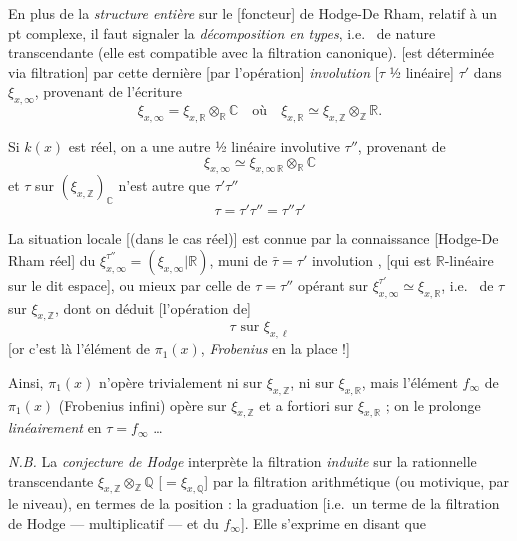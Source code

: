 \documentclass[11pt,a4paper]{article}
\begin{document}
En plus de la \emph{structure entière} sur le \struck{\ill{}} [foncteur] de
Hodge-De Rham, relatif à un pt complexe, il faut signaler la
\emph{décomposition en types}, i.e.\  de nature
transcendante (elle est compatible avec la filtration canonique).
 \ill{} [est déterminée via filtration] par cette
dernière \struck{\ill{}} [par l'opération] \emph{involution} [$\tau$
½ linéaire] $\tau'$ dans $\xi_{x,\infty}$, provenant de l'écriture
\[
  \xi_{x,\infty} = \xi_{x,\mathbb{R}} \otimes_{\mathbb{R}} \mathbb{C}
  \quad\text{où}\quad
  \xi_{x,\mathbb{R}} \simeq \xi_{x,\mathbb{Z}} \otimes_{\mathbb{Z}}
  \mathbb{R} .
\]

Si $k(x)$ est réel, on a une autre  ½ linéaire
involutive $\tau''$, provenant de
\[
  \xi_{x,\infty} \simeq \xi_{x,\infty\,\mathbb{R}} \otimes_{\mathbb{R}}
  \mathbb{C}
\]
et $\tau$ sur $(\xi_{x,\mathbb{Z}})_{\mathbb{C}}$ n'est autre que
$\tau'\tau''$
\[
  \tau = \tau'\tau'' = \tau''\tau'
\]

La situation locale [(dans le cas réel)] est connue par la connaissance
[Hodge-De Rham réel] du $\xi_{x,\infty}^{\tau''} = (\xi_{x,\infty}
|\mathbb{R})$, muni de $\bar{\tau} = \tau'$ involution \ill{},
[qui est $\mathbb{R}$-linéaire sur le dit espace], ou mieux par celle de
$\tau = \tau''$ opérant sur $\xi_{x,\infty}^{\tau'} \simeq
\xi_{x,\mathbb{R}}$, i.e.\ \ill{} de $\tau$ sur $\xi_{x,\mathbb{Z}}$, dont on
déduit \ill{} [l'opération de]
\[
  \boxed{\tau \text{ sur } \xi_{x,\ell}}
\]
[or c'est là l'élément de $\pi_1(x)$, \emph{Frobenius} en la place
 !]

Ainsi, $\pi_1(x)$ n'opère trivialement ni sur $\xi_{x,\mathbb{Z}}$, ni
 sur $\xi_{x,\mathbb{R}}$, mais l'élément $f_\infty$ de
$\pi_1(x)$ (Frobenius infini) opère sur $\xi_{x,\mathbb{Z}}$ et a fortiori sur
$\xi_{x,\mathbb{R}}$ ; on le prolonge \emph{linéairement} en $\tau =
f_\infty$ …

\emph{N.B.} La \emph{conjecture de Hodge} interprète la filtration
\emph{induite} sur la  rationnelle transcendante
$\xi_{x,\mathbb{Z}} \otimes_{\mathbb{Z}} \mathbb{Q}$ [$=
\xi_{x,\mathbb{Q}}$] par la filtration arithmétique (ou motivique, par le
niveau), en termes de la position \ill{} : la graduation [i.e.\ un terme de
la filtration de Hodge --- \ill{} multiplicatif --- et du $f_\infty$]. Elle
s'exprime en disant que
\end{document}
